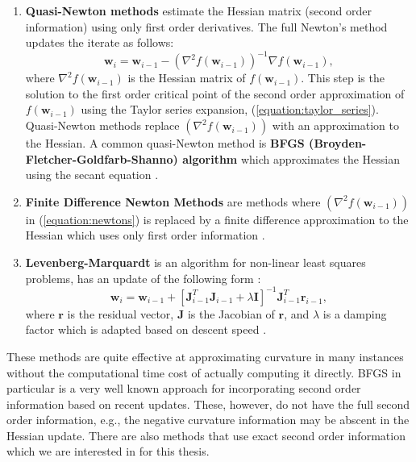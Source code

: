 \documentclass[letterpaper,12pt,titlepage,oneside,final]{book}
\begin{document}
	\begin{enumerate}
		\item{\textbf{Quasi-Newton methods} estimate the Hessian matrix (second order information) using only first order derivatives. The full Newton's method updates the iterate as follows:
			\begin{equation}
			\mathbf{w}_{i} = \mathbf{w}_{i-1} - (\nabla^{2}{f(\mathbf{w}_{i-1})})^{-1}\nabla{f(\mathbf{w}_{i-1})},
			\label{equation:newtons}
			\end{equation}
			where $\nabla^{2}{f(\mathbf{w}_{i-1})}$ is the Hessian matrix of $f(
			\mathbf{w}_{i-1})$. This step is the solution to the first order critical point of the second order approximation of $f(\mathbf{w}_{i-1})$ using the Taylor series expansion, (\ref{equation:taylor_series}). Quasi-Newton methods replace $(\nabla^{2}{f(\mathbf{w}_{i-1})})$ with an approximation to the Hessian. A common quasi-Newton method is \textbf{BFGS (Broyden-Fletcher-Goldfarb-Shanno) algorithm} which approximates the Hessian using the secant equation \cite{Shepherd.1997}.  
		}
		\item{\textbf{Finite Difference Newton Methods} are methods where $(\nabla^{2}{f(\mathbf{w}_{i-1})})$ in (\ref{equation:newtons}) is replaced by a finite difference approximation to the Hessian which uses only first order information \cite{Shepherd.1997}.}
		\item{\textbf{Levenberg-Marquardt} is an algorithm for non-linear least squares problems, has an update of the following form \cite{Shepherd.1997}:
			\begin{equation}
			\mathbf{w}_{i} = \mathbf{w}_{i-1} + [\mathbf{J}^{T}_{i-1}\mathbf{J}^{}_{i-1} + \lambda\mathbf{I}]^{-1}\mathbf{J}^{T}_{i-1}\mathbf{r}_{i-1},
			\end{equation}    
			where $\mathbf{r}$ is the residual vector, $\mathbf{J}$ is the Jacobian of $\mathbf{r}$, and $\lambda$ is a damping factor which is adapted based on descent speed \cite{Shepherd.1997}. }    
	\end{enumerate}
	These methods are quite effective at approximating curvature in many instances without the computational time cost of actually computing it directly. BFGS in particular is a very well known approach for incorporating second order information based on recent updates. These, however, do not have the full second order information, e.g., the negative curvature information may be abscent in the Hessian update. There are also methods that use exact second order information which we are interested in for this thesis. 
\end{document}
